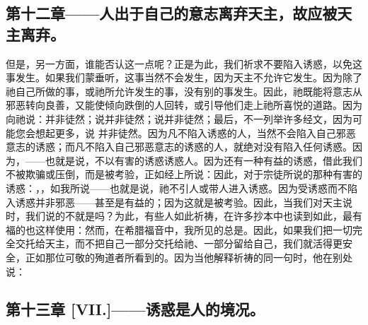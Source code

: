 \subsection{第十二章——人出于自己的意志离弃天主，故应被天主离弃。}

但是，另一方面，谁能否认这一点呢？正是为此，我们祈求不要陷入诱惑，以免这事发生。如果我们蒙垂听，这事当然不会发生，因为天主不允许它发生。因为除了祂自己所做的事，或祂所允许发生的事，没有别的事发生。因此，祂既能将意志从邪恶转向良善，又能使倾向跌倒的人回转，或引导他们走上祂所喜悦的道路。因为向祂说：并非徒然；说并非徒然；说并非徒然；最后，不一列举许多经文，因为可能您会想起更多，说 并非徒然。因为凡不陷入诱惑的人，当然不会陷入自己邪恶意志的诱惑；而凡不陷入自己邪恶意志的诱惑的人，就绝对没有陷入任何诱惑。因为，——也就是说，不以有害的诱惑诱惑人。因为还有一种有益的诱惑，借此我们不被欺骗或压倒，而是被考验，正如经上所说：因此，对于宗徒所说的那种有害的诱惑：，，如我所说——也就是说，祂不引人或带人进入诱惑。因为受诱惑而不陷入诱惑并非邪恶——甚至是有益的；因为这就是被考验。因此，当我们对天主说时，我们说的不就是吗？为此，有些人如此祈祷，在许多抄本中也读到如此，最有福的也这样使用：然而，在希腊福音中，我所见的总是。因此，如果我们把一切完全交托给天主，而不把自己一部分交托给祂、一部分留给自己，我们就活得更安全，正如那位可敬的殉道者所看到的。因为当他解释祈祷的同一句时，他在别处说：\par


\subsection{第十三章 [VII.]——诱惑是人的境况。}

